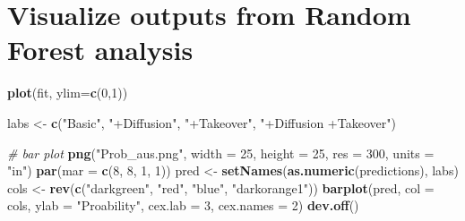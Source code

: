 \documentclass[]{book}
\newenvironment{Shaded}{\begin{snugshade}}{\end{snugshade}}
\newcommand{\KeywordTok}[1]{\textcolor[rgb]{0.13,0.29,0.53}{\textbf{{#1}}}}
\newcommand{\DataTypeTok}[1]{\textcolor[rgb]{0.13,0.29,0.53}{{#1}}}
\newcommand{\DecValTok}[1]{\textcolor[rgb]{0.00,0.00,0.81}{{#1}}}
\newcommand{\StringTok}[1]{\textcolor[rgb]{0.31,0.60,0.02}{{#1}}}
\newcommand{\CommentTok}[1]{\textcolor[rgb]{0.56,0.35,0.01}{\textit{{#1}}}}
\newcommand{\NormalTok}[1]{{#1}}
\theoremstyle{definition}
\theoremstyle{definition}
\theoremstyle{remark}
\begin{document}
\begin{Shaded}
\end{Shaded}

\section{Visualize outputs from Random Forest
analysis}\label{visualize-outputs-from-random-forest-analysis}

\begin{Shaded}
\begin{Highlighting}[]
\KeywordTok{plot}\NormalTok{(fit, }\DataTypeTok{ylim=}\KeywordTok{c}\NormalTok{(}\DecValTok{0}\NormalTok{,}\DecValTok{1}\NormalTok{))}
\end{Highlighting}
\end{Shaded}

\begin{Shaded}
\begin{Highlighting}[]
\NormalTok{labs <-}\StringTok{ }\KeywordTok{c}\NormalTok{(}\StringTok{"Basic"}\NormalTok{, }\StringTok{"+Diffusion"}\NormalTok{, }\StringTok{"+Takeover"}\NormalTok{, }\StringTok{"+Diffusion +Takeover"}\NormalTok{)}
\end{Highlighting}
\end{Shaded}

\begin{Shaded}
\begin{Highlighting}[]
\CommentTok{# bar plot}
\KeywordTok{png}\NormalTok{(}\StringTok{"Prob_aus.png"}\NormalTok{, }\DataTypeTok{width =} \DecValTok{25}\NormalTok{, }\DataTypeTok{height =} \DecValTok{25}\NormalTok{, }\DataTypeTok{res =} \DecValTok{300}\NormalTok{, }\DataTypeTok{units =} \StringTok{"in"}\NormalTok{)}
\KeywordTok{par}\NormalTok{(}\DataTypeTok{mar =} \KeywordTok{c}\NormalTok{(}\DecValTok{8}\NormalTok{, }\DecValTok{8}\NormalTok{, }\DecValTok{1}\NormalTok{, }\DecValTok{1}\NormalTok{))}
\NormalTok{pred <-}\StringTok{ }\KeywordTok{setNames}\NormalTok{(}\KeywordTok{as.numeric}\NormalTok{(predictions), labs)}
\NormalTok{cols <-}\StringTok{ }\KeywordTok{rev}\NormalTok{(}\KeywordTok{c}\NormalTok{(}\StringTok{"darkgreen"}\NormalTok{, }\StringTok{"red"}\NormalTok{, }\StringTok{"blue"}\NormalTok{, }\StringTok{"darkorange1"}\NormalTok{))}
\KeywordTok{barplot}\NormalTok{(pred, }\DataTypeTok{col =}\NormalTok{ cols, }\DataTypeTok{ylab =} \StringTok{"Proability"}\NormalTok{, }\DataTypeTok{cex.lab =} \DecValTok{3}\NormalTok{, }\DataTypeTok{cex.names =} \DecValTok{2}\NormalTok{)}
\KeywordTok{dev.off}\NormalTok{()}
\end{Highlighting}
\end{Shaded}
\end{document}
